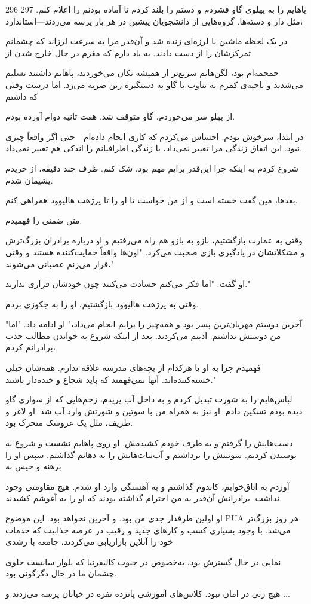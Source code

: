 296 297
پاهایم را به پهلوی گاو فشردم و دستم را بلند کردم تا آماده بودنم را اعلام کنم. مثل دار و دسته‌ها. گروه‌هایی از دانشجویان پیشین در هر بار پرسه می‌زدند—استاندارد،

در یک لحظه ماشین با لرزه‌ای زنده شد و آن‌قدر مرا به سرعت لرزاند که چشمانم تمرکزشان را از دست دادند. به یاد دارم که مغزم در حال خارج شدن از

جمجمه‌ام بود، لگن‌هایم سریع‌تر از همیشه تکان می‌خوردند، پاهایم داشتند تسلیم می‌شدند و ناحیه‌ی کمرم به تناوب با گاو به دستگیره زین ضربه می‌زد. اما درست وقتی که داشتم

از پهلو سر می‌خوردم، گاو متوقف شد. هفت ثانیه دوام آورده بودم.

در ابتدا، سرخوش بودم. احساس می‌کردم که کاری انجام داده‌ام—حتی اگر واقعاً چیزی نبود. این اتفاق زندگی مرا تغییر نمی‌داد، یا زندگی اطرافیانم را اندکی هم تغییر نمی‌داد.

شروع کردم به اینکه چرا این‌قدر برایم مهم بود، شک کنم. ظرف چند دقیقه، از خریدم پشیمان شدم.

بعدها، مین گفت خسته است و از من خواست تا او را تا پرژهت هالیوود همراهی کنم.

متن ضمنی را فهمیدم.

وقتی به عمارت بازگشتیم، بازو به بازو هم راه می‌رفتیم و او درباره برادران بزرگ‌ترش و مشکلاتشان در یادگیری بازی صحبت می‌کرد. "اون‌ها واقعاً حمایت‌کننده هستند و وقتی قرار می‌زنم عصبانی می‌شوند،"

او گفت. "اما فکر می‌کنم حسادت می‌کنند چون خودشان قراری ندارند."

وقتی به پرژهت هالیوود بازگشتیم، او را به جکوزی بردم.

"آخرین دوستم مهربان‌ترین پسر بود و همه‌چیز را برایم انجام می‌داد،" او ادامه داد. "اما من دوستش نداشتم. اذیتم می‌کردند. بعد از اینکه شروع به خواندن مطالب جذب برادرانم کردم،

فهمیدم چرا به او یا هرکدام از بچه‌های مدرسه علاقه ندارم. همه‌شان خیلی خسته‌کننده‌اند. آنها نمی‌فهمند که باید شجاع و خنده‌دار باشند."

لباس‌هایم را به شورت تبدیل کردم و به داخل آب پریدم، زخم‌هایی که از سواری گاو دیده بودم تسکین دادم. او نیز به همراه من با سوتین و شورتش وارد آب شد. او لاغر و ظریف، مثل یک عروسک متحرک بود.

دست‌هایش را گرفتم و به طرف خودم کشیدمش. او روی پاهایم نشست و شروع به بوسیدن کردیم. سوتینش را برداشتم و آب‌نبات‌هایش را به دهانم گذاشتم. سپس او را برهنه و خیس به

آوردم به اتاق‌خوابم، کاندوم گذاشتم و به آهستگی وارد او شدم. هیچ مقاومتی وجود نداشت. برادرانش آن‌قدر به من احترام گذاشته بودند که او را به آغوشم کشیدند.

او اولین طرفدار جدی من بود. و آخرین نخواهد بود. این موضوع PUA هر روز بزرگ‌تر می‌شد. با وجود بسیاری کسب و کارهای جدید و رقیب در عرصه جذابیت که خدمات خود را آنلاین بازاریابی می‌کردند، جامعه با رشدی 

نمایی در حال گسترش بود، به‌خصوص در جنوب کالیفرنیا که بلوار سانست جلوی چشمان ما در حال دگرگونی بود.

هیچ زنی در امان نبود. کلاس‌های آموزشی پانزده نفره در خیابان پرسه می‌زدند و ...